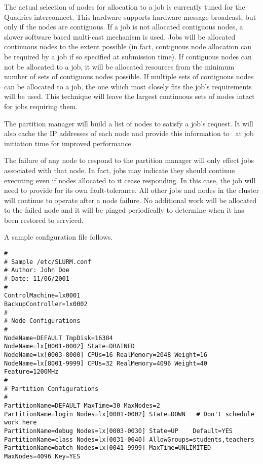 The actual selection of nodes for allocation to a job is currently
tuned for the Quadrics interconnect.  This hardware supports hardware
message broadcast, but only if the nodes are contiguous.  If a job
is not allocated contiguous nodes, a slower software based multi-cast
mechanism is used.  Jobs will be allocated continuous nodes to the
extent possible (in fact, contiguous node allocation can be required
by a job if so specified at submission time).  If contiguous nodes
can not be allocated to a job, it will be allocated resources from
the minimum number of sets of contiguous nodes possible.  If multiple
sets of contiguous nodes can be allocated to a job, the one which most
closely fits the job's requirements will be used.  This technique will
leave the largest continuous sets of nodes intact for jobs requiring them.

The partition manager will build a list of nodes to satisfy a job's
request.  It will also cache the IP addresses of
each node and provide this information to \srun\ at job initiation
time for improved performance.

The failure of any node to respond to the partition manager will only
effect jobs associated with that node.  In fact, jobs may indicate they
should continue executing even if nodes allocated to it cease responding.
In this case, the job will need to provide for its own fault-tolerance.
All other jobs and nodes in the cluster will continue to operate after
a node failure.  No additional work will be allocated to the failed
node and it will be pinged periodically to determine when it has been
restored to serviced.

A sample configuration file follows.

\begin{verbatim}
# 
# Sample /etc/SLURM.conf
# Author: John Doe
# Date: 11/06/2001
#
ControlMachine=lx0001
BackupController=lx0002
#
# Node Configurations
#
NodeName=DEFAULT TmpDisk=16384
NodeName=lx[0001-0002] State=DRAINED
NodeName=lx[0003-8000] CPUs=16 RealMemory=2048 Weight=16
NodeName=lx[8001-9999] CPUs=32 RealMemory=4096 Weight=40 Feature=1200MHz
#
# Partition Configurations
#
PartitionName=DEFAULT MaxTime=30 MaxNodes=2
PartitionName=login Nodes=lx[0001-0002] State=DOWN   # Don't schedule work here
PartitionName=debug Nodes=lx[0003-0030] State=UP    Default=YES
PartitionName=class Nodes=lx[0031-0040] AllowGroups=students,teachers
PartitionName=batch Nodes=lx[0041-9999] MaxTime=UNLIMITED MaxNodes=4096 Key=YES
\end{verbatim}

